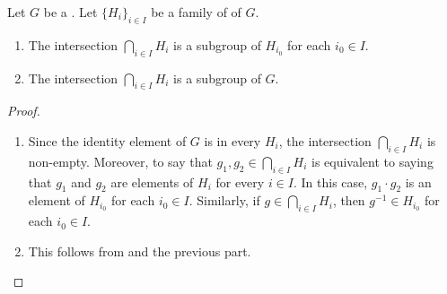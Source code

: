 \begin{lemma} \label{lemma:intersection_of_subgroups_of_a_group_is_a_subgroup}
    Let $G$ be a . Let $\{H_i\}_{i \in I}$ be a family of  of $G$. 
    \begin{enumerate}
        \item The intersection $\bigcap_{i \in I} H_i$ is a subgroup of $H_{i_0}$ for each $i_0 \in I$.
        \item The intersection $\bigcap_{i \in I} H_i$ is a subgroup of $G$. 
    \end{enumerate}
\end{lemma}
\begin{proof}
    \begin{enumerate}
        \item Since the identity element of $G$ is in every $H_i$, the intersection $\bigcap_{i \in I} H_i$ is non-empty. Moreover, to say that $g_1,g_2 \in \bigcap_{i \in I} H_i$ is equivalent to saying that $g_1$ and $g_2$ are elements of $H_i$ for every $i \in I$. In this case, $g_1 \cdot g_2$ is an element of $H_{i_0}$ for each $i_0 \in I$. Similarly, if $g \in \bigcap_{i \in I} H_i$, then $g^{-1} \in H_{i_0}$ for each $i_0 \in I$.
        \item This follows from  and the previous part. 
    \end{enumerate}
\end{proof}